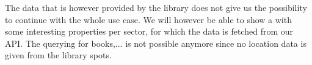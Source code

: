 The data that is however provided by the library does not give us the possibility to continue with the whole use case. We will however be able to show a with some interesting properties per sector, for which the data is fetched from our API. The querying for books,... is not possible anymore since no location data is given from the library spots.
